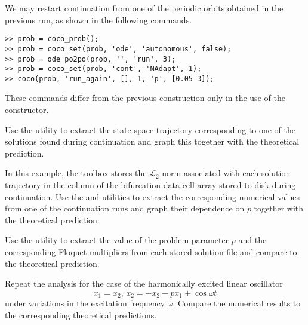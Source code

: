 We may restart continuation from one of the periodic orbits obtained in the previous run, as shown in the following commands.
\begin{lstlisting}[language=coco-highlight]
>> prob = coco_prob();
>> prob = coco_set(prob, 'ode', 'autonomous', false);
>> prob = ode_po2po(prob, '', 'run', 3);
>> prob = coco_set(prob, 'cont', 'NAdapt', 1);
>> coco(prob, 'run_again', [], 1, 'p', [0.05 3]);
\end{lstlisting}
These commands differ from the previous construction only in the use of the  constructor.\\
\medskip

\begin{exercises}
\item Use the  utility to extract the state-space trajectory corresponding to one of the solutions found during continuation and graph this together with the theoretical prediction.

\item In this example, the  toolbox stores the $\mathcal{L}_2$ norm associated with each solution trajectory in the  column of the bifurcation data cell array stored to disk during continuation. Use the  and  utilities to extract the corresponding numerical values from one of the continuation runs and graph their dependence on $p$ together with the theoretical prediction.

\item Use the  utility to extract the value of the problem parameter $p$ and the corresponding Floquet multipliers from each stored solution file and compare to the theoretical prediction.
\item Repeat the analysis for the case of the harmonically excited linear oscillator
\[
\dot{x}_1=x_2,\,\dot{x}_2=-x_2-px_1+\cos \omega t
\]
under variations in the excitation frequency $\omega$. Compare the numerical results to the corresponding theoretical predictions.
\end{exercises}

